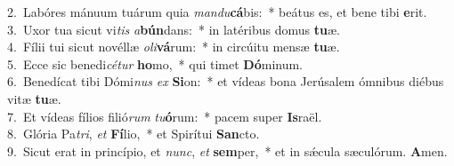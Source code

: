 {2.~}Labóres mánuum tuárum quia \textit{man}\textit{du}\textbf{cá}bis:~* beátus es, et bene tibi \textbf{e}rit.\\
{3.~}Uxor tua sicut vi\textit{tis} \textit{a}\textbf{bún}dans:~* in latéribus domus \textbf{tu}æ.\\
{4.~}Fílii tui sicut novéllæ \textit{o}\textit{li}\textbf{vá}rum:~* in circúitu mensæ \textbf{tu}æ.\\
{5.~}Ecce sic benedi\textit{cé}\textit{tur} \textbf{ho}mo,~* qui timet \textbf{Dó}minum.\\
{6.~}Benedícat tibi Dómi\textit{nus} \textit{ex} \textbf{Si}on:~* et vídeas bona Jerúsalem ómnibus diébus vitæ \textbf{tu}æ.\\
{7.~}Et vídeas fílios filió\textit{rum} \textit{tu}\textbf{ó}rum:~* pacem super \textbf{Is}raël.\\
{8.~}Glória Pa\textit{tri}, \textit{et} \textbf{Fí}lio,~* et Spirítui \textbf{San}cto.\\
{9.~}Sicut erat in princípio, et \textit{nunc}, \textit{et} \textbf{sem}per,~* et in sǽcula sæculórum. \textbf{A}men.\\
